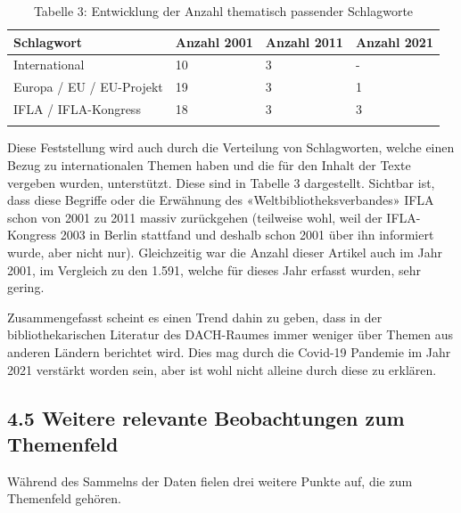 \documentclass[a4paper,
fontsize=11pt,
oneside,
numbers=noperiodatend,
parskip=half-,
bibliography=totoc,
final
]{scrartcl}
\begin{document}
\begin{longtable}{llll}
\textbf{Schlagwort}        & \textbf{Anzahl 2001} & \textbf{Anzahl 2011} & \textbf{Anzahl 2021} \\
\hline
International              & 10                   & 3                    & -                    \\
Europa / EU /   EU-Projekt & 19                   & 3                    & 1                    \\
IFLA /   IFLA-Kongress     & 18                   & 3                    & 3                   \\
\caption{Tabelle 3: Entwicklung der Anzahl thematisch passender Schlagworte}\\
\end{longtable}

Diese Feststellung wird auch durch die Verteilung von Schlagworten,
welche einen Bezug zu internationalen Themen haben und die für den
Inhalt der Texte vergeben wurden, unterstützt. Diese sind in Tabelle 3
dargestellt. Sichtbar ist, dass diese Begriffe oder die Erwähnung des
«Weltbibliotheksverbandes» IFLA schon von 2001 zu 2011 massiv
zurückgehen (teilweise wohl, weil der IFLA-Kongress 2003 in Berlin
stattfand und deshalb schon 2001 über ihn informiert wurde, aber nicht
nur). Gleichzeitig war die Anzahl dieser Artikel auch im Jahr 2001, im
Vergleich zu den 1.591, welche für dieses Jahr erfasst wurden, sehr
gering.

Zusammengefasst scheint es einen Trend dahin zu geben, dass in der
bibliothekarischen Literatur des DACH-Raumes immer weniger über Themen
aus anderen Ländern berichtet wird. Dies mag durch die Covid-19 Pandemie
im Jahr 2021 verstärkt worden sein, aber ist wohl nicht alleine durch
diese zu erklären.

\hypertarget{weitere-relevante-beobachtungen-zum-themenfeld}{%
\subsection{4.5 Weitere relevante Beobachtungen zum
Themenfeld}\label{weitere-relevante-beobachtungen-zum-themenfeld}}

Während des Sammelns der Daten fielen drei weitere Punkte auf, die zum
Themenfeld gehören.
\end{document}
